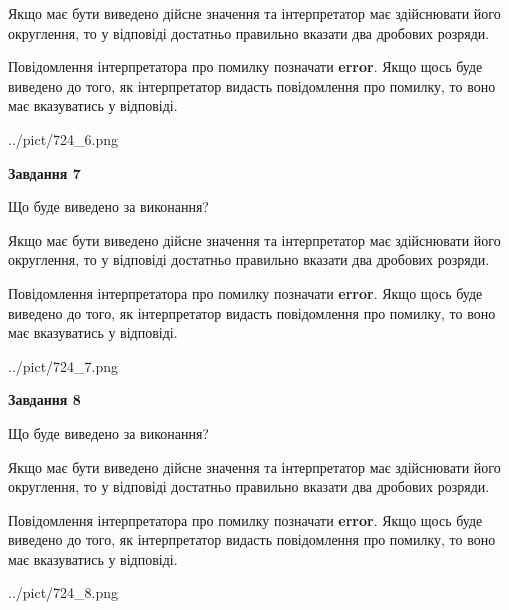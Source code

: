 \documentclass[12pt, ukrainian]{article}
\begin{document}
{\begin {Large}
Якщо має бути виведено дійсне значення та інтерпретатор має здійснювати його округлення, 
то у відповіді достатньо правильно вказати два дробових розряди.

Повідомлення інтерпретатора про помилку позначати \textbf{error}.
Якщо щось буде виведено до того, як інтерпретатор видасть повідомлення про помилку, 
то воно має вказуватись у відповіді. \par

\begin{center}
	{../pict/724_6.png}
\end{center}
\newpage

{\begin {center}\textbf{Завдання 7}\end {center}}\par
Що буде виведено за виконання? \par

Якщо має бути виведено дійсне значення та інтерпретатор має здійснювати його округлення, 
то у відповіді достатньо правильно вказати два дробових розряди.

Повідомлення інтерпретатора про помилку позначати \textbf{error}.
Якщо щось буде виведено до того, як інтерпретатор видасть повідомлення про помилку, 
то воно має вказуватись у відповіді. \par

\begin{center}
	{../pict/724_7.png}
\end{center}
\newpage

{\begin {center}\textbf{Завдання 8}\end {center}}\par
Що буде виведено за виконання? \par

Якщо має бути виведено дійсне значення та інтерпретатор має здійснювати його округлення, 
то у відповіді достатньо правильно вказати два дробових розряди.

Повідомлення інтерпретатора про помилку позначати \textbf{error}.
Якщо щось буде виведено до того, як інтерпретатор видасть повідомлення про помилку, 
то воно має вказуватись у відповіді. \par

\begin{center}
	{../pict/724_8.png}
\end{center}
\newpage


\end{Large}}
\end{document}
